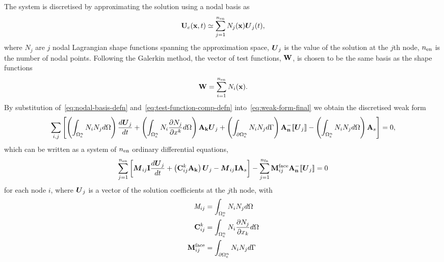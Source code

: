 The system is discretised by approximating the solution using a nodal basis as
\begin{align}
\mathbf{U}_e(\mathbf{x},t) \simeq \sum_{j=1}^{n_\textrm{en}} N_{j} (\mathbf{x}) \boldsymbol{U}_{j}(t) ,
\label{eq:nodal-basis-defn}
\end{align}
where $N_{j}$ are $j$ nodal Lagrangian shape functions spanning the approximation space,
$\boldsymbol{U}_{j}$ is the value of the solution at the $j$th node, $n_\textrm{en}$ is the number of nodal
points. Following the Galerkin method, the
vector of test functions, $\mathbf{W}$, is chosen to be the same basis as the shape
functions
\begin{align}
\mathbf{W} = \sum_{i=1}^{n_\textrm{en}} N_{i}(\mathbf{x}).
\label{eq:test-function-comp-defn}
\end{align}
By substitution of~\eqref{eq:nodal-basis-defn} and~\eqref{eq:test-function-comp-defn} into~\eqref{eq:weak-form-final} we obtain the discretised weak form
\begin{align*}
\sum_{i,j} \left[
  \left(
    \int_{\Omega_e^{n}} N_i N_j d\Omega
  \right)
  \frac{d \boldsymbol{U}_j}{d t}
+
  \left(
    \int_{\Omega_e^{n}} N_i \frac{\partial N_j}{\partial x^k} d\Omega
  \right)
  \mathbf{A}_\mathbf{k} \boldsymbol{U}_j
+
  \left(
  \int_{\partial \Omega_e^{n}} N_i N_j d\Gamma 
  \right)
  \mathbf{A}_\mathbf{n}^{-} \llbracket \boldsymbol{U}_{j} \rrbracket
-
  \left(
  \int_{\Omega_e^{n}} N_i N_j d\Omega
  \right)
  \mathbf{A}_s 
  \right]  = 0,
\end{align*}
which can be written as a system of $n_\textrm{en}$ ordinary differential equations,
$$
\sum_{j=1}^{n_\textrm{en}}
\left[
\boldsymbol{M}_{ij} \mathbf{I} \frac{d \boldsymbol{U}_j}{d t} +
\left( \mathbf{C}^{k}_{ij} \mathbf{A}_\mathbf{k} \right) \boldsymbol{U}_j -
\boldsymbol{M}_{ij} \mathbf{I} \mathbf{A}_s
\right]
- \sum_{j=1}^{n_\textrm{fn}} \mathbf{M}^{\textrm{face}}_{ij} \mathbf{A}_\mathbf{n}^{-} \llbracket \boldsymbol{U}_j \rrbracket
= 0
$$
for each node $i$, where $\boldsymbol{U}_j$ is a vector of the solution coefficients at
the $j$th node, with
\begin{align*}
\mathit{M}_{ij} &= \int_{\Omega_e^{n}} N_i N_j d\Omega \\
\mathbf{C}^{k}_{ij} &= \int_{\Omega_e^{n}} N_i \frac{\partial N_j}{\partial x_{k}}d\Omega \\
\mathbf{M}^{\textrm{face}}_{ij} &= \int_{\partial \Omega_e^{n}} N_i N_j
  d\Gamma
\end{align*}
